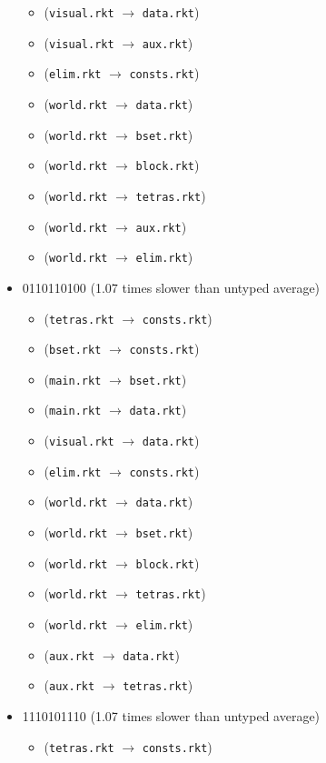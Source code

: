 \documentclass{article}
\newcommand{\mono}[1]{\texttt{#1}}
\begin{document}
\begin{itemize}
\begin{itemize}
  \item (\mono{visual.rkt} $\rightarrow$ \mono{data.rkt})
  \item (\mono{visual.rkt} $\rightarrow$ \mono{aux.rkt})
  \item (\mono{elim.rkt} $\rightarrow$ \mono{consts.rkt})
  \item (\mono{world.rkt} $\rightarrow$ \mono{data.rkt})
  \item (\mono{world.rkt} $\rightarrow$ \mono{bset.rkt})
  \item (\mono{world.rkt} $\rightarrow$ \mono{block.rkt})
  \item (\mono{world.rkt} $\rightarrow$ \mono{tetras.rkt})
  \item (\mono{world.rkt} $\rightarrow$ \mono{aux.rkt})
  \item (\mono{world.rkt} $\rightarrow$ \mono{elim.rkt})
  \end{itemize}
\item 0110110100 (1.07 times slower than untyped average)
  \begin{itemize}
  \item (\mono{tetras.rkt} $\rightarrow$ \mono{consts.rkt})
  \item (\mono{bset.rkt} $\rightarrow$ \mono{consts.rkt})
  \item (\mono{main.rkt} $\rightarrow$ \mono{bset.rkt})
  \item (\mono{main.rkt} $\rightarrow$ \mono{data.rkt})
  \item (\mono{visual.rkt} $\rightarrow$ \mono{data.rkt})
  \item (\mono{elim.rkt} $\rightarrow$ \mono{consts.rkt})
  \item (\mono{world.rkt} $\rightarrow$ \mono{data.rkt})
  \item (\mono{world.rkt} $\rightarrow$ \mono{bset.rkt})
  \item (\mono{world.rkt} $\rightarrow$ \mono{block.rkt})
  \item (\mono{world.rkt} $\rightarrow$ \mono{tetras.rkt})
  \item (\mono{world.rkt} $\rightarrow$ \mono{elim.rkt})
  \item (\mono{aux.rkt} $\rightarrow$ \mono{data.rkt})
  \item (\mono{aux.rkt} $\rightarrow$ \mono{tetras.rkt})
  \end{itemize}
\item 1110101110 (1.07 times slower than untyped average)
  \begin{itemize}
  \item (\mono{tetras.rkt} $\rightarrow$ \mono{consts.rkt})

\end{itemize}
\end{itemize}
\end{document}
